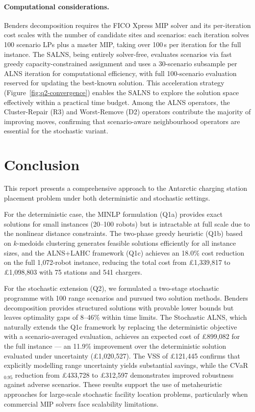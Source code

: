 \documentclass[11pt,a4paper]{article}
\begin{document}
\paragraph{Computational considerations.}
Benders decomposition requires the FICO Xpress MIP solver and its per-iteration cost scales with the number of candidate sites and scenarios: each iteration solves 100 scenario LPs plus a master MIP, taking over 100\,s per iteration for the full instance.
The SALNS, being entirely solver-free, evaluates scenarios via fast greedy capacity-constrained assignment and uses a 30-scenario subsample per ALNS iteration for computational efficiency, with full 100-scenario evaluation reserved for updating the best-known solution.
This acceleration strategy (Figure~\ref{fig:q2-convergence}) enables the SALNS to explore the solution space effectively within a practical time budget.
Among the ALNS operators, the Cluster-Repair (R3) and Worst-Remove (D2) operators contribute the majority of improving moves, confirming that scenario-aware neighbourhood operators are essential for the stochastic variant.


\newpage
\section{Conclusion}
\label{sec:conclusion}

This report presents a comprehensive approach to the Antarctic charging station placement problem under both deterministic and stochastic settings.

For the deterministic case, the MINLP formulation (Q1a) provides exact solutions for small instances (20--100 robots) but is intractable at full scale due to the nonlinear distance constraints.
The two-phase greedy heuristic (Q1b) based on $k$-medoids clustering generates feasible solutions efficiently for all instance sizes, and the ALNS+LAHC framework (Q1c) achieves an 18.0\% cost reduction on the full 1,072-robot instance, reducing the total cost from \pounds1,339,817 to \pounds1,098,803 with 75 stations and 541 chargers.

For the stochastic extension (Q2), we formulated a two-stage stochastic programme with 100 range scenarios and pursued two solution methods.
Benders decomposition provides structured solutions with provable lower bounds but leaves optimality gaps of 8--46\% within time limits.
The Stochastic ALNS, which naturally extends the Q1c framework by replacing the deterministic objective with a scenario-averaged evaluation, achieves an expected cost of \pounds899,082 for the full instance --- an 11.9\% improvement over the deterministic solution evaluated under uncertainty (\pounds1,020,527).
The VSS of \pounds121,445 confirms that explicitly modelling range uncertainty yields substantial savings, while the CVaR$_{0.95}$ reduction from \pounds433,728 to \pounds312,597 demonstrates improved robustness against adverse scenarios.
These results support the use of metaheuristic approaches for large-scale stochastic facility location problems, particularly when commercial MIP solvers face scalability limitations.
\end{document}
